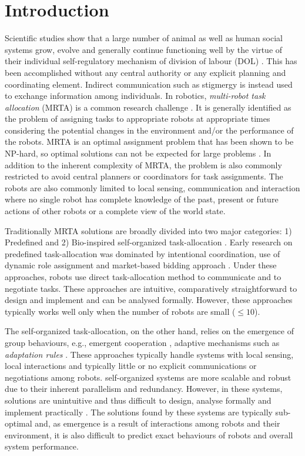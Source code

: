 \documentclass{llncs}
\begin{document}
\section{Introduction}
\label{sec:intro}
Scientific studies show that a large number of animal as well as human social systems grow, evolve and generally continue functioning well by the virtue of their individual self-regulatory mechanism of division of labour (DOL)  \cite{Bonabeau+1999}.
This has been accomplished without any central authority or any explicit planning and coordinating element.
Indirect communication such as stigmergy is instead used to exchange information among individuals. 
In robotics, \textit{multi-robot task allocation} (MRTA) is a common research challenge \cite{Gerkey+2004}.
It is generally identified as the problem of assigning tasks to appropriate robots at appropriate times considering the potential changes in the environment and/or the performance of the robots.
MRTA is an optimal assignment problem that has been shown to be NP-hard, so optimal solutions can not be expected for large problems \cite{Parker2008}.
In addition to the inherent complexity of MRTA, the problem is also commonly restricted to avoid central planners or coordinators for task assignments.
The robots are also commonly limited to local sensing, communication and interaction \cite{Lerman+2006} where no single robot has complete knowledge of the past, present or future actions of other robots or a complete view of the world state.

Traditionally MRTA solutions are broadly divided into two major categories: 1) Predefined  and 2) Bio-inspired self-organized task-allocation \cite{Shen+2001}. Early research on predefined task-allocation was dominated by intentional coordination, use of dynamic role assignment \cite{Parker2008} and market-based bidding approach \cite{Dias+2006}. Under these approaches, robots use direct task-allocation method to communicate and to negotiate tasks.
These approaches are intuitive, comparatively straightforward to design and implement and can be analysed formally.
However, these approaches typically works well only when the number of robots are small ($\leq 10$).

The self-organized task-allocation, on the other hand, relies on the emergence of group behaviours, e.g., emergent cooperation \cite{Lerman+2006}, adaptive mechanisms such as {\em adaptation rules} \cite{Liu+2007}. These approaches typically handle systems with local sensing, local interactions and typically little or no explicit communications or negotiations among robots. self-organized systems are more scalable and robust due to their inherent parallelism and redundancy. However, in these systems, solutions are unintuitive and thus difficult to design, analyse formally and implement practically \cite{Gerkey+2004,Lerman+2006}.
The solutions found by these systems are typically sub-optimal and, as emergence is a result of interactions among robots and their environment, it is also difficult to predict exact behaviours of robots and overall system performance.
\end{document}
